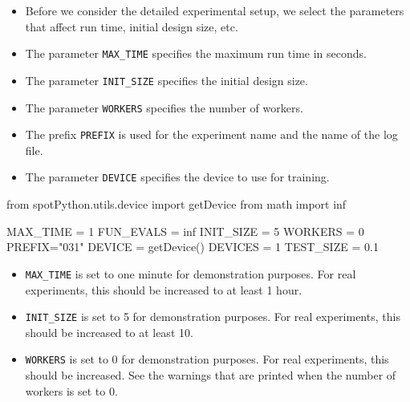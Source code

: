 \documentclass[
  letterpaper,
  DIV=11,
  numbers=noendperiod]{scrreprt}
\newenvironment{Shaded}{\begin{snugshade}}{\end{snugshade}}
\newcommand{\DecValTok}[1]{\textcolor[rgb]{0.68,0.00,0.00}{#1}}
\newcommand{\FloatTok}[1]{\textcolor[rgb]{0.68,0.00,0.00}{#1}}
\newcommand{\ImportTok}[1]{\textcolor[rgb]{0.00,0.46,0.62}{#1}}
\newcommand{\NormalTok}[1]{\textcolor[rgb]{0.00,0.23,0.31}{#1}}
\newcommand{\OperatorTok}[1]{\textcolor[rgb]{0.37,0.37,0.37}{#1}}
\newcommand{\StringTok}[1]{\textcolor[rgb]{0.13,0.47,0.30}{#1}}
\providecommand{\tightlist}{%
  \setlength{\itemsep}{0pt}\setlength{\parskip}{0pt}}\usepackage{longtable,booktabs,array}
\begin{document}
\begin{itemize}
\tightlist
\item
  Before we consider the detailed experimental setup, we select the
  parameters that affect run time, initial design size, etc.
\item
  The parameter \texttt{MAX\_TIME} specifies the maximum run time in
  seconds.
\item
  The parameter \texttt{INIT\_SIZE} specifies the initial design size.
\item
  The parameter \texttt{WORKERS} specifies the number of workers.
\item
  The prefix \texttt{PREFIX} is used for the experiment name and the
  name of the log file.
\item
  The parameter \texttt{DEVICE} specifies the device to use for
  training.
\end{itemize}

\begin{Shaded}
\begin{Highlighting}[]
\ImportTok{from}\NormalTok{ spotPython.utils.device }\ImportTok{import}\NormalTok{ getDevice}
\ImportTok{from}\NormalTok{ math }\ImportTok{import}\NormalTok{ inf}

\NormalTok{MAX\_TIME }\OperatorTok{=} \DecValTok{1}
\NormalTok{FUN\_EVALS }\OperatorTok{=}\NormalTok{ inf}
\NormalTok{INIT\_SIZE }\OperatorTok{=} \DecValTok{5}
\NormalTok{WORKERS }\OperatorTok{=} \DecValTok{0}
\NormalTok{PREFIX}\OperatorTok{=}\StringTok{"031"}
\NormalTok{DEVICE }\OperatorTok{=}\NormalTok{ getDevice()}
\NormalTok{DEVICES }\OperatorTok{=} \DecValTok{1}
\NormalTok{TEST\_SIZE }\OperatorTok{=} \FloatTok{0.1}
\end{Highlighting}
\end{Shaded}

\begin{tcolorbox}[enhanced jigsaw, coltitle=black, bottomrule=.15mm, breakable, toprule=.15mm, colframe=quarto-callout-caution-color-frame, title=\textcolor{quarto-callout-caution-color}{\faFire}\hspace{0.5em}{Caution: Run time and initial design size should be increased for real
experiments}, colbacktitle=quarto-callout-caution-color!10!white, opacityback=0, left=2mm, leftrule=.75mm, colback=white, rightrule=.15mm, bottomtitle=1mm, toptitle=1mm, titlerule=0mm, arc=.35mm, opacitybacktitle=0.6]

\begin{itemize}
\tightlist
\item
  \texttt{MAX\_TIME} is set to one minute for demonstration purposes.
  For real experiments, this should be increased to at least 1 hour.
\item
  \texttt{INIT\_SIZE} is set to 5 for demonstration purposes. For real
  experiments, this should be increased to at least 10.
\item
  \texttt{WORKERS} is set to 0 for demonstration purposes. For real
  experiments, this should be increased. See the warnings that are
  printed when the number of workers is set to 0.
\end{itemize}

\end{tcolorbox}
\end{document}
